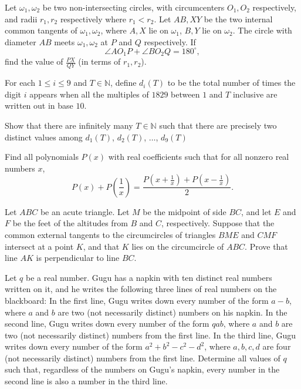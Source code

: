 \documentclass[11pt]{scrartcl}
\begin{document}
\begin{problem}[689874125173032]
Let $\omega_1,\omega_2$ be two non-intersecting circles, with circumcenters $O_1,O_2$ respectively, and radii $r_1,r_2$ respectively where $r_1 < r_2$. Let $AB,XY$ be the two internal common tangents of $\omega_1,\omega_2$, where $A,X$ lie on $\omega_1$, $B,Y$ lie on $\omega_2$. The circle with diameter $AB$ meets $\omega_1,\omega_2$ at $P$ and $Q$ respectively. If$$\angle AO_1P+\angle BO_2Q=180^{\circ},$$find the value of $\frac{PX}{QY}$ (in terms of $r_1,r_2$).
\end{problem}
\begin{problem}[526922799283626]
	For each $1\leq i\leq 9$ and $T\in\mathbb N$, define $d_i(T)$ to be the total number of times the digit $i$ appears when all the multiples of $1829$ between $1$ and $T$ inclusive are written out in base $10$.

Show that there are infinitely many $T\in\mathbb N$ such that there are precisely two distinct values among $d_1(T)$, $d_2(T)$, $\dots$, $d_9(T)$
\end{problem}
\begin{problem}[53652353880893]
Find all polynomials \(P(x)\) with real coefficients such that for all nonzero real numbers \(x\),\[P(x)+P\left(\frac1x\right)     =\frac{P\left(x+\frac1x\right) +P\left(x-\frac1x\right)}2.\]
\end{problem}
\begin{problem}[4018921933875333744]
	Let $ABC$ be an acute triangle. Let $M$ be the midpoint of side $BC$, and let $E$ and $F$ be the feet of the altitudes from $B$ and $C$, respectively. Suppose that the common external tangents to the circumcircles of triangles $BME$ and $CMF$ intersect at a point $K$, and that $K$ lies on the circumcircle of $ABC$. Prove that line $AK$ is perpendicular to line $BC$.
\end{problem}
\begin{problem}[653318686726030]
Let $q$ be a real number. Gugu has a napkin with ten distinct real numbers written on it, and he writes the following three lines of real numbers on the blackboard:
In the first line, Gugu writes down every number of the form $a-b$, where $a$ and $b$ are two (not necessarily distinct) numbers on his napkin.
In the second line, Gugu writes down every number of the form $qab$, where $a$ and $b$ are
two (not necessarily distinct) numbers from the first line.
In the third line, Gugu writes down every number of the form $a^2+b^2-c^2-d^2$, where $a, b, c, d$ are four (not necessarily distinct) numbers from the first line.
Determine all values of $q$ such that, regardless of the numbers on Gugu's napkin, every number in the second line is also a number in the third line.
\end{problem}
\end{document}
